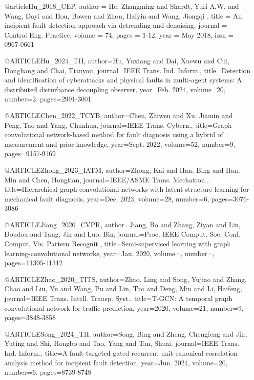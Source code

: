 @article{Hu_2018_CEP,
author = {He, Zhangming and Shardt, Yuri A.W. and Wang, Dayi and Hou, Bowen and Zhou, Haiyin and Wang, Jiongqi },
title = {An incipient fault detection approach via detrending and denoising},
journal = {Control Eng. Practice},
volume = {74},
pages = {1-12},
year = {May 2018},
issn = {0967-0661}}

@ARTICLE{Hu_2024_TII,
  author={Hu, Yuxiang and Dai, Xuewu and Cui, Dongliang and Chai, Tianyou},
  journal={IEEE Trans. Ind. Inform.}, 
  title={Detection and identification of cyberattacks and physical faults in multi-agent systems: A distributed disturbance decoupling observer}, 
  year={Feb. 2024},
  volume={20},
  number={2},
  pages={2991-3001}}

@ARTICLE{Chen_2022_TCYB,
  author={Chen, Zhiwen and Xu, Jiamin and Peng, Tao and Yang, Chunhua},
  journal={IEEE Trans. Cybern.}, 
  title={Graph convolutional network-based method for fault diagnosis using a hybrid of measurement and prior knowledge}, 
  year={Sept. 2022},
  volume={52},
  number={9},
  pages={9157-9169}}


@ARTICLE{Zhong_2023_IATM,
  author={Zhong, Kai and Han, Bing and Han, Min and Chen, Hongtian},
  journal={IEEE/ASME Trans. Mechatron.}, 
  title={Hierarchical graph convolutional networks with latent structure learning for mechanical fault diagnosis}, 
  year={Dec. 2023},
  volume={28},
  number={6},
  pages={3076-3086}}

@ARTICLE{Jiang_2020_CVPR,
  author={Jiang, Bo and Zhang, Ziyan and Lin, Doudou and Tang, Jin and Luo, Bin},
  journal={Proc. IEEE Comput. Soc. Conf. Comput. Vis. Pattern Recognit.}, 
  title={Semi-supervised learning with graph learning-convolutional networks}, 
  year={Jan. 2020},
  volume={},
  number={},
  pages={11305-11312}}


@ARTICLE{Zhao_2020_TITS,
  author={Zhao, Ling and Song, Yujiao and Zhang, Chao and Liu, Yu and Wang, Pu and Lin, Tao and Deng, Min and Li, Haifeng},
  journal={IEEE Trans. Intell. Transp. Syst.}, 
  title={T-{GCN}: A temporal graph convolutional network for traffic prediction}, 
  year={2020},
  volume={21},
  number={9},
  pages={3848-3858}}



@ARTICLE{Song_2024_TII,
  author={Song, Bing and Zheng, Chengfeng and Jin, Yuting and Shi, Hongbo and Tao, Yang and Tan, Shuai},
  journal={IEEE Trans. Ind. Inform.}, 
  title={A fault-targeted gated recurrent unit-canonical correlation analysis method for incipient fault detection}, 
  year={Jun. 2024},
  volume={20},
  number={6},
  pages={8739-8748}}


